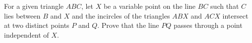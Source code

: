 For a given triangle $ABC$, let $X$ be a variable point on the line $BC$ such that $C$ lies between $B$ and $X$ and the incircles of the triangles $ABX$ and $ACX$ intersect at two distinct points $P$ and $Q$. Prove that the line $PQ$ passes through a point independent of $X$.
